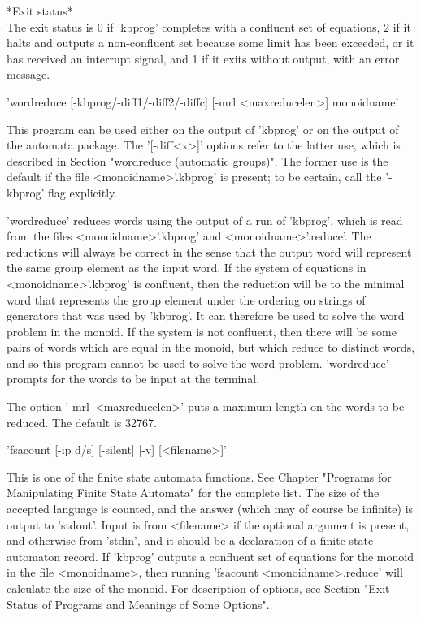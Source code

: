 *Exit status*\\
The exit status is 0 if 'kbprog' completes with a confluent set of equations,
2 if it halts and outputs a non-confluent set because some limit has
been exceeded, or it has received an interrupt signal, and 1 if it exits
without output, with an error message.

'wordreduce  [-kbprog/-diff1/-diff2/-diffc] [-mrl <maxreducelen>] monoidname' 

This program can be used either on the output of 'kbprog' or on the output
of the automata package. The '[-diff<x>]' options refer to the latter use,
which is described in Section
"wordreduce (automatic groups)".
The former use is the default if
the file <monoidname>'.kbprog' is present; to be certain, call the
'-kbprog' flag explicitly.

'wordreduce' reduces words using the output of a run of 'kbprog', which is
read from the files <monoidname>'.kbprog' and <monoidname>'.reduce'.
The reductions will always be
correct in the sense that the output word will represent the same group
element as the input word. If the system of equations in <monoidname>'.kbprog'
is confluent, then the reduction will be to the minimal word that represents
the group element under the ordering on strings of generators that was used
by 'kbprog'. It can therefore be used to solve the word problem in the
monoid. If the system is not confluent, then there will be some pairs of words 
which are equal in the monoid, but which reduce to distinct words, and
so this program cannot be used to solve the word problem.
'wordreduce' prompts for the words to be input at the terminal.

The option '-mrl\ <maxreducelen>' puts a maximum length on the words to
be reduced. The default is 32767.


'fsacount  [-ip d/s] [-silent] [-v] [<filename>]'

This is one of the finite state automata functions. See Chapter 
"Programs for Manipulating Finite State Automata" for the complete list.
The size of the accepted language is counted, and the answer (which may
of course be infinite) is output to 'stdout'. Input is from <filename> if
the optional argument is present, and otherwise from 'stdin', and it
should be a declaration of a finite state automaton record.
If 'kbprog' outputs a confluent set of equations for the monoid in the file
<monoidname>, then running 'fsacount <monoidname>.reduce'
will calculate the size of the monoid.
For description of options, see Section
"Exit Status of Programs and Meanings of Some Options".

